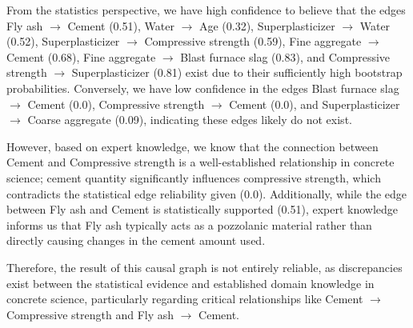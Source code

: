 \documentclass{article}
\begin{document}
From the statistics perspective, we have high confidence to believe that the edges Fly ash $\rightarrow$ Cement (0.51), Water $\rightarrow$ Age (0.32), Superplasticizer $\rightarrow$ Water (0.52), Superplasticizer $\rightarrow$ Compressive strength (0.59), Fine aggregate $\rightarrow$ Cement (0.68), Fine aggregate $\rightarrow$ Blast furnace slag (0.83), and Compressive strength $\rightarrow$ Superplasticizer (0.81) exist due to their sufficiently high bootstrap probabilities. Conversely, we have low confidence in the edges Blast furnace slag $\rightarrow$ Cement (0.0), Compressive strength $\rightarrow$ Cement (0.0), and Superplasticizer $\rightarrow$ Coarse aggregate (0.09), indicating these edges likely do not exist.

However, based on expert knowledge, we know that the connection between Cement and Compressive strength is a well-established relationship in concrete science; cement quantity significantly influences compressive strength, which contradicts the statistical edge reliability given (0.0). Additionally, while the edge between Fly ash and Cement is statistically supported (0.51), expert knowledge informs us that Fly ash typically acts as a pozzolanic material rather than directly causing changes in the cement amount used.

Therefore, the result of this causal graph is not entirely reliable, as discrepancies exist between the statistical evidence and established domain knowledge in concrete science, particularly regarding critical relationships like Cement $\rightarrow$ Compressive strength and Fly ash $\rightarrow$ Cement.
\end{document}
